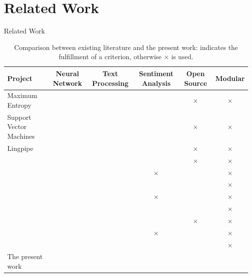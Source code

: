 \documentclass[11pt]{beamer}
\begin{document}
\section{Related Work}
\begin{frame}{Related Work}
	\begin{table}[!h]
	\caption[Comparison between existing literature and the present work.]{Comparison between existing literature and the present work: \checkmark indicates the fulfillment of a criterion, otherwise $\times$ is used.}
	\vspace{0.5cm}
	\centering
	\begin{adjustbox}{width=1\textwidth}
	\begin{tabular}[t]{lccccc}
	\hline
		\textbf{Project} & \textbf{Neural Network} & \textbf{Text Processing} & \textbf{Sentiment Analysis } & \textbf{Open Source} & \textbf{Modular}
	\\ \hline
	\citet{rf10} Maximum Entropy & \checkmark & \checkmark & \checkmark & $\times$ & $\times$
	\\ \hline
	\citet{rf10} Support Vector Machines & \checkmark & \checkmark & \checkmark & $\times$ & $\times$
	\\ \hline
	\citet{rf10} Lingpipe & \checkmark & \checkmark & \checkmark &  $\times$ & $\times$
	\\ \hline
	\citet{rf6} & \checkmark & \checkmark & \checkmark &  $\times$ & $\times$
	\\ \hline
	\citet{rf14} & \checkmark & \checkmark & $\times$ & \checkmark & $\times$
	\\ \hline
	\citet{rf5} & \checkmark & \checkmark & \checkmark & \checkmark & $\times$
	\\ \hline
	\citet{rf11} & \checkmark & \checkmark & $\times$ &  \checkmark & $\times$
	\\ \hline
	\citet{rf12} & \checkmark & \checkmark & \checkmark &  \checkmark & $\times$
	\\ \hline
	\citet{rf13} & \checkmark & \checkmark & \checkmark & $\times$ & $\times$
	\\ \hline
	\citet{rf15} & \checkmark & \checkmark & $\times$ &  \checkmark & $\times$
	\\ \hline
	\citet{rf16} & \checkmark & \checkmark & \checkmark & \checkmark & $\times$
	\\ \hline
	The present work & \checkmark & \checkmark & \checkmark & \checkmark & \checkmark
	\\ \hline
	\end{tabular}
	\end{adjustbox}
	\end{table}
\end{frame}
\end{document}

